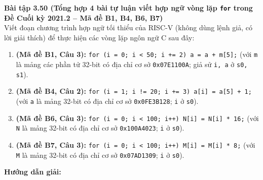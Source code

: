 \textbf{Bài tập 3.50 (Tổng hợp 4 bài tự luận viết hợp ngữ vòng lặp \texttt{for} trong Đề Cuối kỳ 2021.2 -- Mã đề B1, B4, B6, B7)}\\
Viết đoạn chương trình hợp ngữ tối thiểu của RISC-V (không dùng lệnh giả, có lời giải thích) để thực hiện các vòng lặp ngôn ngữ C sau đây:
\begin{enumerate}[label=\alph*)]
    \item \textbf{(Mã đề B1, Câu 3):} \texttt{for (i = 0; i < 50; i += 2) a = a + m[5];} (với \texttt{m} là mảng các phần tử 32-bit có địa chỉ cơ sở \texttt{0x07E1100A}; giả sử \texttt{i, a} ở \texttt{s0, s1}).
    \item \textbf{(Mã đề B4, Câu 2):} \texttt{for (i = 1; i != 20; i += 3) a[i] = a[5] + 1;} (với \texttt{a} là mảng 32-bit có địa chỉ cơ sở \texttt{0x0FE3B128}; \texttt{i} ở \texttt{s0}).
    \item \textbf{(Mã đề B6, Câu 3):} \texttt{for (i = 0; i < 100; i++) N[i] = N[i] * 16;} (với \texttt{N} là mảng 32-bit có địa chỉ cơ sở \texttt{0x100A4023}; \texttt{i} ở \texttt{s0}).
    \item \textbf{(Mã đề B7, Câu 3):} \texttt{for (i = 0; i < 100; i++) M[i] = M[i] * 8;} (với \texttt{M} là mảng 32-bit có địa chỉ cơ sở \texttt{0x07AD1309}; \texttt{i} ở \texttt{s0}).
\end{enumerate}
\textbf{Hướng dẫn giải:}
